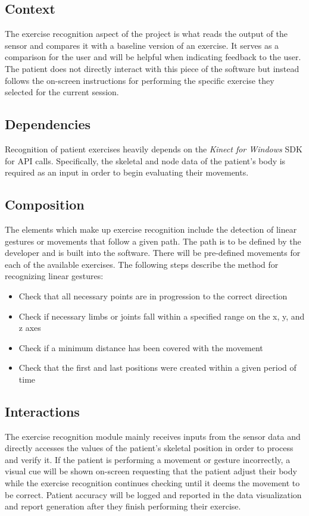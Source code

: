\documentclass[onecolumn, draftclsnofoot,10pt, compsoc]{IEEEtran}
\begin{document}
\subsection{Context}
The exercise recognition aspect of the project is what reads the output of the sensor and compares it with a baseline version of an exercise. It serves as a comparison for the user and will be helpful when indicating feedback to the user. The patient does not directly interact with this piece of the software but instead follows the on-screen instructions for performing the specific exercise they selected for the current session.  

\subsection{Dependencies}
Recognition of patient exercises heavily depends on the \textit{Kinect for Windows} SDK for API calls. Specifically, the skeletal and node data of the patient's body is required as an input in order to begin evaluating their movements. 

\subsection{Composition}
The elements which make up exercise recognition include the detection of linear gestures or movements that follow a given path. The path is to be defined by the developer and is built into the software. There will be pre-defined movements for each of the available exercises. The following steps describe the method for recognizing linear gestures: 
\begin{itemize}
\item Check that all necessary points are in progression to the correct direction 
\item Check if necessary limbs or joints fall within a specified range on the x, y, and z axes 
\item Check if a minimum distance has been covered with the movement 
\item Check that the first and last positions were created within a given period of time 
\end{itemize}


\subsection{Interactions}
The exercise recognition module mainly receives inputs from the sensor data and directly accesses the values of the patient's skeletal position in order to process and verify it. If the patient is performing a movement or gesture incorrectly, a visual cue will be shown on-screen requesting that the patient adjust their body while the exercise recognition continues checking until it deems the movement to be correct. Patient accuracy will be logged and reported in the data visualization and report generation after they finish performing their exercise. 
\end{document}
